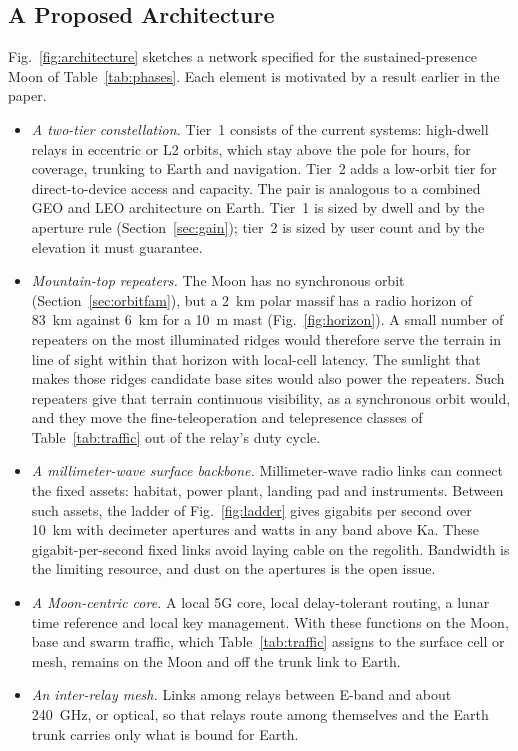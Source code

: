 \documentclass{IEEEoj}
\begin{document}
\subsection{A Proposed Architecture}
Fig.~\ref{fig:architecture} sketches a network specified for the sustained-presence Moon of Table~\ref{tab:phases}. Each element is motivated by a result earlier in the paper.
\begin{itemize}
\item \emph{A two-tier constellation.} Tier~1 consists of the current systems: high-dwell relays in eccentric or L2 orbits, which stay above the pole for hours, for coverage, trunking to Earth and navigation. Tier~2 adds a low-orbit tier for direct-to-device access and capacity. The pair is analogous to a combined GEO and LEO architecture on Earth. Tier~1 is sized by dwell and by the aperture rule (Section~\ref{sec:gain}); tier~2 is sized by user count and by the elevation it must guarantee.
\item \emph{Mountain-top repeaters.} The Moon has no synchronous orbit (Section~\ref{sec:orbitfam}), but a \SI{2}{km} polar massif has a radio horizon of \SI{83}{km} against \SI{6}{km} for a \SI{10}{m} mast (Fig.~\ref{fig:horizon}). A small number of repeaters on the most illuminated ridges would therefore serve the terrain in line of sight within that horizon with local-cell latency. The sunlight that makes those ridges candidate base sites would also power the repeaters. Such repeaters give that terrain continuous visibility, as a synchronous orbit would, and they move the fine-teleoperation and telepresence classes of Table~\ref{tab:traffic} out of the relay's duty cycle.
\item \emph{A millimeter-wave surface backbone.} Millimeter-wave radio links can connect the fixed assets: habitat, power plant, landing pad and instruments. Between such assets, the ladder of Fig.~\ref{fig:ladder} gives gigabits per second over \SI{10}{km} with decimeter apertures and watts in any band above Ka. These gigabit-per-second fixed links avoid laying cable on the regolith. Bandwidth is the limiting resource, and dust on the apertures is the open issue.
\item \emph{A Moon-centric core.} A local 5G core, local delay-tolerant routing, a lunar time reference and local key management. With these functions on the Moon, base and swarm traffic, which Table~\ref{tab:traffic} assigns to the surface cell or mesh, remains on the Moon and off the trunk link to Earth.
\item \emph{An inter-relay mesh.} Links among relays between E-band and about \SI{240}{GHz}, or optical, so that relays route among themselves and the Earth trunk carries only what is bound for Earth.

\end{itemize}
\end{document}
